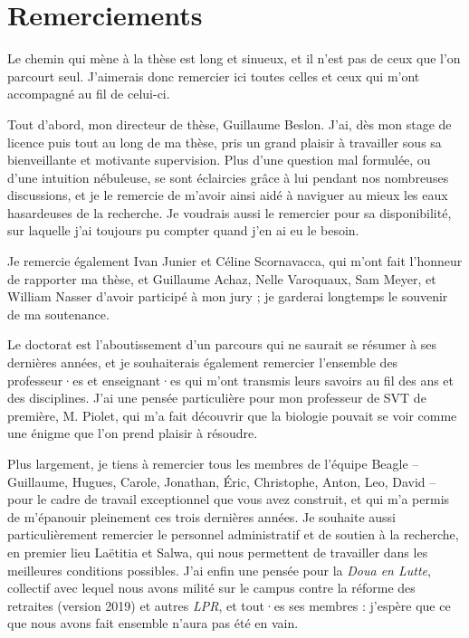 
\chapter{Remerciements}

Le chemin qui mène à la thèse est long et sinueux, et il n'est pas de ceux que l'on parcourt seul.
J'aimerais donc remercier ici toutes celles et ceux qui m'ont accompagné au fil de celui-ci.

Tout d'abord, mon directeur de thèse, Guillaume Beslon.
J'ai, dès mon stage de licence puis tout au long de ma thèse, pris un grand plaisir à travailler sous sa bienveillante et motivante supervision.
Plus d'une question mal formulée, ou d'une intuition nébuleuse, se sont éclaircies grâce à lui pendant nos nombreuses discussions, et je le remercie de m'avoir ainsi aidé à naviguer au mieux les eaux hasardeuses de la recherche.
Je voudrais aussi le remercier pour sa disponibilité, sur laquelle j'ai toujours pu compter quand j'en ai eu le besoin.

Je remercie également Ivan Junier et Céline Scornavacca, qui m'ont fait l'honneur de rapporter ma thèse, et Guillaume Achaz, Nelle Varoquaux, Sam Meyer, et William Nasser d'avoir participé à mon jury ; je garderai longtemps le souvenir de ma soutenance.

Le doctorat est l'aboutissement d'un parcours qui ne saurait se résumer à ses dernières années, et je souhaiterais également remercier l'ensemble des professeur·es et enseignant·es qui m'ont transmis leurs savoirs au fil des ans et des disciplines.
J'ai une pensée particulière pour mon professeur de SVT de première, M. Piolet, qui m'a fait découvrir que la biologie pouvait se voir comme une énigme que l'on prend plaisir à résoudre.

Plus largement, je tiens à remercier tous les membres de l'équipe Beagle -- Guillaume, Hugues, Carole, Jonathan, Éric, Christophe, Anton, Leo, David -- pour le cadre de travail exceptionnel que vous avez construit, et qui m'a permis de m'épanouir pleinement ces trois dernières années.
Je souhaite aussi particulièrement remercier le personnel administratif et de soutien à la recherche, en premier lieu Laëtitia et Salwa, qui nous permettent de travailler dans les meilleures conditions possibles.
J'ai enfin une pensée pour la \emph{Doua en Lutte}, collectif avec lequel nous avons milité sur le campus contre la réforme des retraites (version 2019) et autres \emph{LPR}, et tout·es ses membres : j'espère que ce que nous avons fait ensemble n'aura pas été en vain.

